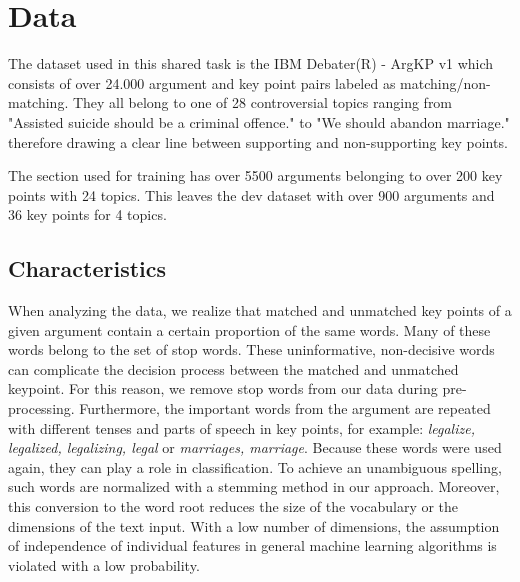 \section{Data}\label{data}

The dataset used in this shared task is the IBM Debater(R) - ArgKP v1 \cite{Bar-HaimEFKLS2020} which consists of over 
24.000 argument and key point pairs labeled as matching/non-matching.
They all belong to one of 28 controversial topics ranging from "Assisted suicide should be a criminal offence." to 
"We should abandon marriage." therefore drawing a clear line between supporting and non-supporting key points.

The section used for training has over 5500 arguments belonging to over 200 key points with 24 topics. This leaves the 
dev dataset with over 900 arguments and 36 key points for 4 topics.

\subsection{Characteristics}

When analyzing the data, we realize that matched and unmatched key points of a given argument contain a certain proportion of the same words. 
Many of these words belong to the set of stop words. 
These uninformative, non-decisive words can complicate the decision process between the matched and unmatched keypoint. 
For this reason, we remove stop words from our data during pre-processing. 
Furthermore, the important words from the argument are repeated with different tenses and parts of speech in key points, for example: \textit{legalize, legalized, legalizing, legal} or \textit{marriages, marriage}.
Because these words were used again, they can play a role in classification. 
To achieve an unambiguous spelling, such words are normalized with a stemming method in our approach. 
Moreover, this conversion to the word root reduces the size of the vocabulary or the dimensions of the text input. 
With a low number of dimensions, the assumption of independence of individual features in general machine learning algorithms is violated with a low probability. 


